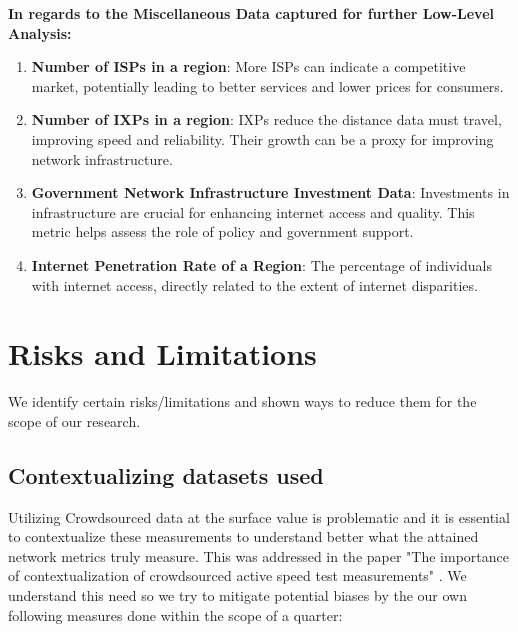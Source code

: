 \documentclass[conference]{IEEEtran}
\begin{document}
\textbf{In regards to the Miscellaneous Data captured for further Low-Level Analysis:}
\begin{enumerate}
    \item \textbf{Number of ISPs in a region}: More ISPs can indicate a competitive market, potentially leading to better services and lower prices for consumers.
    \item \textbf{Number of IXPs in a region}: IXPs reduce the distance data must travel, improving speed and reliability. Their growth can be a proxy for improving network infrastructure.
    \item \textbf{Government Network Infrastructure Investment Data}: Investments in infrastructure are crucial for enhancing internet access and quality. This metric helps assess the role of policy and government support.
    \item \textbf{Internet Penetration Rate of a Region}: The percentage of individuals with internet access, directly related to the extent of internet disparities.
\end{enumerate}


\section{Risks and Limitations}

We identify certain risks/limitations and shown ways to reduce them for the scope of our research.

\subsection{Contextualizing datasets used}
Utilizing Crowdsourced data at the surface value is problematic and it is essential to contextualize these measurements to understand better what the attained network metrics truly measure. This was addressed in the paper "The importance of contextualization of crowdsourced active speed test measurements" \cite{5}. We understand this need so we try to mitigate potential biases by the our own following measures done within the scope of a quarter:
\end{document}
